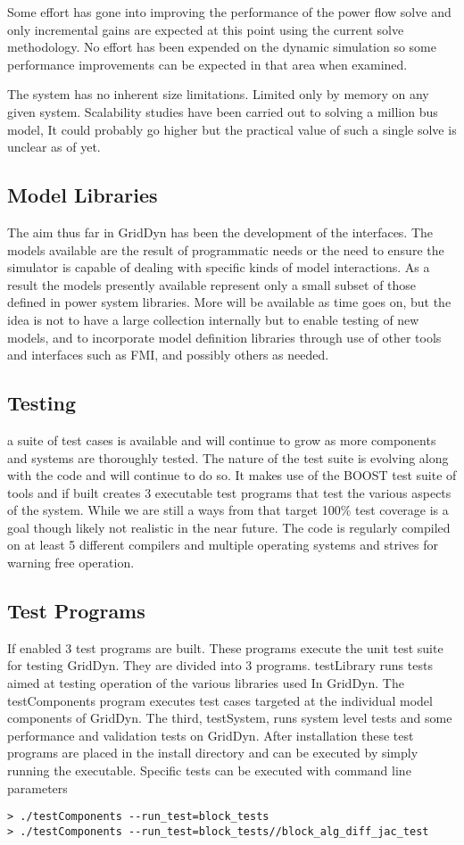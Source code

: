 \documentclass[12pt]{article} %
\begin{document}
Some effort has gone into improving the performance of the power flow solve and only incremental gains are expected at this point using the current solve methodology.  No effort has been expended on the dynamic simulation so some performance improvements can be expected in that area when examined.

The system has no inherent size limitations.  Limited only by memory on any given system.  Scalability studies have been carried out to solving a million bus model,  It could probably go higher but the practical value of such a single solve is unclear as of yet.

\subsection{Model Libraries}
The aim thus far in GridDyn has been the development of the interfaces.  The models available are the result of programmatic needs or the need to ensure the simulator is capable of dealing with specific kinds of model interactions.  As a result the models presently available represent only a small subset of those defined in power system libraries.  More will be available as time goes on, but the idea is not to have a large collection internally but to enable testing of new models, and to incorporate model definition libraries through use of other tools and interfaces such as FMI, and possibly others as needed.

\subsection{Testing}
a suite of test cases is available and will continue to grow as more components and systems are thoroughly tested.  The nature of the test suite is evolving along with the code and will continue to do so.  It makes use of the BOOST test suite of tools and if built creates 3 executable test programs that test the various aspects of the system.  While we are still a ways from that target 100\% test coverage is a goal though likely not realistic in the near future.  The code is regularly compiled on at least 5 different compilers and multiple operating systems and strives for warning free operation.

\subsection{Test Programs}
If enabled 3 test programs are built.  These programs execute the unit test suite for testing GridDyn.  They are divided into 3 programs.  testLibrary runs tests aimed at testing operation of the various libraries used In GridDyn.  The testComponents program executes test cases targeted at the individual model components of GridDyn.  The third, testSystem, runs system level tests and some performance and validation tests on GridDyn.  After installation these test programs are placed in the install directory and can be executed by simply running the executable.  Specific tests can be executed with command line parameters
\begin{verbatim}
> ./testComponents --run_test=block_tests
> ./testComponents --run_test=block_tests//block_alg_diff_jac_test
\end{verbatim}
\end{document}
